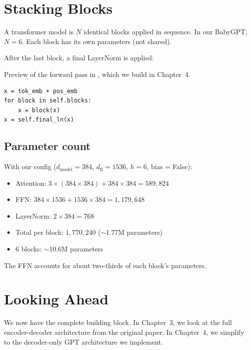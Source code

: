 \section{Stacking Blocks}

A transformer model is $N$ identical blocks applied in sequence. In our BabyGPT, $N = 6$. Each block has its own parameters (not shared).

After the last block, a final LayerNorm is applied:

Preview of the forward pass in , which we build in Chapter~4.

\concepttag
\begin{lstlisting}
x = tok_emb + pos_emb
for block in self.blocks:
    x = block(x)
x = self.final_ln(x)
\end{lstlisting}

\subsection{Parameter count}

With our config ($d_{\text{model}} = 384$, $d_{\text{ff}} = 1536$, $h = 6$, bias = False):

\begin{itemize}
  \item Attention: $3 \times (384 \times 384) + 384 \times 384 = 589{,}824$
  \item FFN: $384 \times 1536 + 1536 \times 384 = 1{,}179{,}648$
  \item LayerNorm: $2 \times 384 = 768$
  \item Total per block: $1{,}770{,}240$ ($\sim$1.77M parameters)
  \item 6 blocks: $\sim$10.6M parameters
\end{itemize}

The FFN accounts for about two-thirds of each block's parameters.

\section{Looking Ahead}

We now have the complete building block. In Chapter~3, we look at the full encoder-decoder architecture from the original paper. In Chapter~4, we simplify to the decoder-only GPT architecture we implement.
